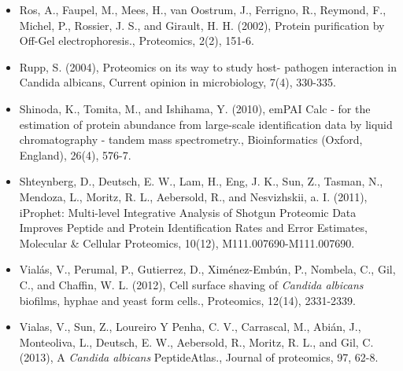 \begin{itemize}
\item[]{%
Ros, A., Faupel, M., Mees, H., van Oostrum, J., Ferrigno, R., Reymond, F., Michel, P., Rossier,
J. S., and Girault, H. H. (2002), Protein purification by Off-Gel electrophoresis., Proteomics,
2(2), 151-6.
}

\item[]{%
Rupp, S. (2004), Proteomics on its way to study host- pathogen interaction in Candida albicans,
 Current opinion in microbiology, 7(4), 330-335.
}

\item[]{%
Shinoda, K., Tomita, M., and Ishihama, Y. (2010), 
emPAI Calc - for the estimation of protein abundance from large-scale
identification data by liquid chromatography - tandem mass spectrometry.,
Bioinformatics (Oxford, England), 26(4), 576-7.
}

\item[]{%
Shteynberg, D., Deutsch, E. W., Lam, H., Eng, J. K., Sun, Z., Tasman, N., Mendoza, L., Moritz,
R. L., Aebersold, R., and Nesvizhskii, a. I. (2011), iProphet: Multi-level Integrative Analysis
of Shotgun Proteomic Data Improves Peptide and Protein Identification Rates and Error
Estimates, Molecular \& Cellular Proteomics, 10(12), M111.007690-M111.007690.
}


\item[]{%
Vial\'as, V., Perumal, P., Gutierrez, D., Xim\'enez-Emb\'un, P., Nombela, C., Gil, C., and Chaffin,
W. L. (2012), Cell surface shaving of \textit{Candida albicans} biofilms, hyphae and yeast form
cells., Proteomics, 12(14), 2331-2339.
}

\item[]{%
Vialas, V., Sun, Z., Loureiro Y Penha, C. V., Carrascal, M., Abi\'an, J., Monteoliva, L., Deutsch,
E. W., Aebersold, R., Moritz, R. L., and Gil, C. (2013), A \textit{Candida albicans} PeptideAtlas.,
Journal of proteomics, 97, 62-8.
}


\end{itemize}
